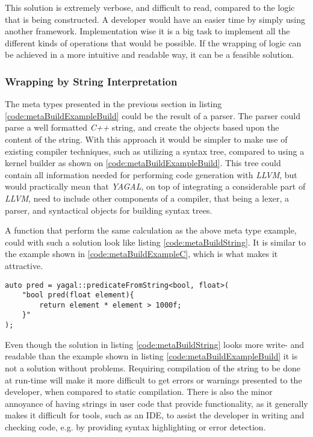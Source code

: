 This solution is extremely verbose, and difficult to read, compared to the logic that is being constructed. A developer would have an easier time by simply using another framework. Implementation wise it is a big task to implement all the different kinds of operations that would be possible. If the wrapping of logic can be achieved in a more intuitive and readable way, it can be a feasible solution.

\subsubsection{Wrapping by String Interpretation}
The meta types presented in the previous section in listing \ref{code:metaBuildExampleBuild} could be the result of a parser. The parser could parse a well formatted \textit{C++} string, and create the objects based upon the content of the string. With this approach it would be simpler to make use of existing compiler techniques, such as utilizing a syntax tree, compared to using a kernel builder as shown on \ref{code:metaBuildExampleBuild}. This tree could contain all information needed for performing  code generation with \textit{LLVM}, but would practically mean that \textit{YAGAL}, on top of integrating a considerable part of \textit{LLVM}, need to include other components of a compiler, that being a lexer, a parser, and syntactical objects for building syntax trees.

A function that perform the same calculation as the above meta type example, could with such a solution look like listing \ref{code:metaBuildString}. It is similar to the example shown in \ref{code:metaBuildExampleC}, which is what makes it attractive. 

\begin{lstlisting}[caption={Code showing possible construction of kernel with string interpretation.}, label={code:metaBuildString}]
auto pred = yagal::predicateFromString<bool, float>(
    "bool pred(float element){
        return element * element > 1000f;
    }"
);
\end{lstlisting}

Even though the solution in listing \ref{code:metaBuildString} looks more write- and readable than the example shown in listing \ref{code:metaBuildExampleBuild} it is not a solution without problems. Requiring compilation of the string to be done at run-time will make it more difficult to get errors or warnings presented to the developer, when compared to static compilation. There is also the minor annoyance of having strings in user code that provide functionality, as it generally makes it difficult for tools, such as an IDE, to assist the developer in writing and checking code, e.g. by providing syntax highlighting or error detection.

